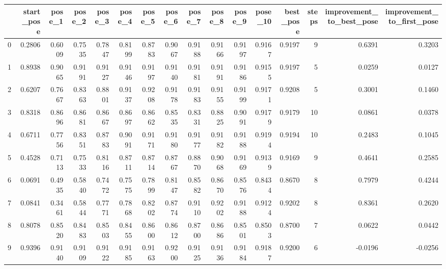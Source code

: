\begin{tabular}{lrrrrrrrrrrrrrrr}
\toprule
{} &  start\_pose &  pose\_1 &  pose\_2 &  pose\_3 &  pose\_4 &  pose\_5 &  pose\_6 &  pose\_7 &  pose\_8 &  pose\_9 &  pose\_10 &  best\_pose &  steps &  improvement\_to\_best\_pose &  improvement\_to\_first\_pose \\
\midrule
0   &      0.2806 &  0.6009 &  0.7535 &  0.7847 &  0.8199 &  0.8783 &  0.9067 &  0.9188 &  0.9166 &  0.9197 &   0.9167 &     0.9197 &      9 &                    0.6391 &                     0.3203 \\
1   &      0.8938 &  0.9065 &  0.9191 &  0.9127 &  0.9146 &  0.9197 &  0.9140 &  0.9181 &  0.9191 &  0.9186 &   0.9155 &     0.9197 &      5 &                    0.0259 &                     0.0127 \\
2   &      0.6207 &  0.7667 &  0.8363 &  0.8801 &  0.9137 &  0.9208 &  0.9178 &  0.9183 &  0.9155 &  0.9199 &   0.9171 &     0.9208 &      5 &                    0.3001 &                     0.1460 \\
3   &      0.8318 &  0.8696 &  0.8681 &  0.8667 &  0.8697 &  0.8662 &  0.8535 &  0.8331 &  0.8825 &  0.9091 &   0.9179 &     0.9179 &     10 &                    0.0861 &                     0.0378 \\
4   &      0.6711 &  0.7756 &  0.8351 &  0.8783 &  0.9091 &  0.9171 &  0.9180 &  0.9177 &  0.9182 &  0.9188 &   0.9194 &     0.9194 &     10 &                    0.2483 &                     0.1045 \\
5   &      0.4528 &  0.7113 &  0.7533 &  0.8116 &  0.8711 &  0.8714 &  0.8767 &  0.8870 &  0.9068 &  0.9169 &   0.9139 &     0.9169 &      9 &                    0.4641 &                     0.2585 \\
6   &      0.0691 &  0.4935 &  0.5840 &  0.7472 &  0.7575 &  0.7899 &  0.8147 &  0.8582 &  0.8670 &  0.8576 &   0.8434 &     0.8670 &      8 &                    0.7979 &                     0.4244 \\
7   &      0.0841 &  0.3461 &  0.5844 &  0.7771 &  0.7868 &  0.8202 &  0.8774 &  0.9110 &  0.9202 &  0.9188 &   0.9124 &     0.9202 &      8 &                    0.8361 &                     0.2620 \\
8   &      0.8078 &  0.8520 &  0.8483 &  0.8503 &  0.8455 &  0.8600 &  0.8612 &  0.8700 &  0.8686 &  0.8501 &   0.8503 &     0.8700 &      7 &                    0.0622 &                     0.0442 \\
9   &      0.9396 &  0.9140 &  0.9109 &  0.9122 &  0.9185 &  0.9163 &  0.9200 &  0.9125 &  0.9136 &  0.9184 &   0.9187 &     0.9200 &      6 &                   -0.0196 &                    -0.0256 \\

\end{tabular}
